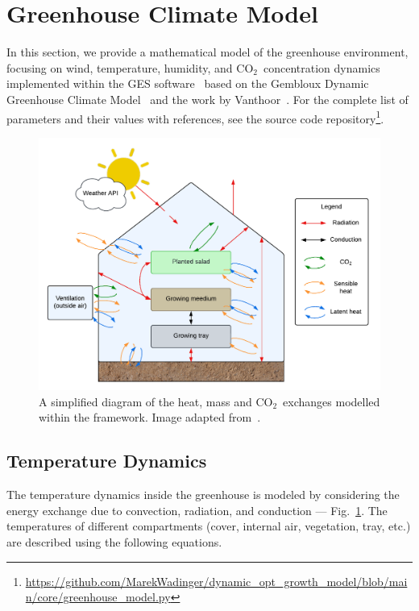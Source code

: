 \documentclass[conference]{IEEEtran}
\newcommand{\coo}{\ensuremath{\mathrm{CO_2}}}
\begin{document}
\section{Greenhouse Climate Model}\label{sec:greenhouse}
In this section, we provide a mathematical model of the greenhouse environment, focusing on wind, temperature, humidity, and \coo\ concentration dynamics implemented within the GES software~\cite{rmward61_2019} based on the Gembloux Dynamic Greenhouse Climate Model~\cite{GDGCM} and the work by Vanthoor~\cite{Vanthoor2011}. For the complete list of parameters and their values with references, see the source code repository\footnote{\url{https://github.com/MarekWadinger/dynamic_opt_growth_model/blob/main/core/greenhouse_model.py}}.

\begin{figure}
    \centering
    \includegraphics[width=\linewidth]{images/diagram.pdf}
    \caption{A simplified diagram of the heat, mass and \coo\ exchanges modelled within the framework. Image adapted from~\cite{rmward61_2019}.}\label{fig:diagram}
\end{figure}

\subsection{Temperature Dynamics}\label{subsec:temperature}

The temperature dynamics inside the greenhouse is modeled by considering the energy exchange due to convection, radiation, and conduction --- Fig.~\ref{fig:diagram}. The temperatures of different compartments (cover, internal air, vegetation, tray, etc.) are described using the following equations.
\end{document}
